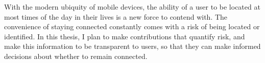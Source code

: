 With the modern ubiquity of mobile devices, the ability of a user to be located at most times of the day in their lives is a new force to contend with. The convenience of staying connected constantly comes with a risk of being located or identified. In this thesis, I plan to make contributions that quantify risk, and make this information to be transparent to users, so that they can make informed decisions about whether to remain connected.